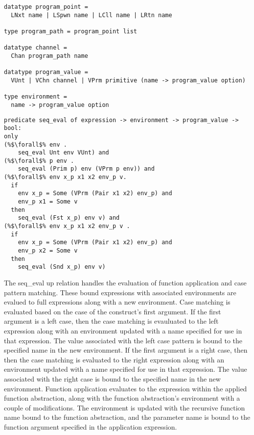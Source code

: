 \documentclass{article}
\begin{document}
\begin{lstlisting}[language=logic, style=codestyle1, escapechar=\%]
datatype program_point =
  LNxt name | LSpwn name | LCll name | LRtn name 

type program_path = program_point list

datatype channel =
  Chan program_path name 

datatype program_value = 
  VUnt | VChn channel | VPrm primitive (name -> program_value option)

type environment =
  name -> program_value option

\end{lstlisting}


\begin{lstlisting}[language=logic, style=codestyle1, escapechar=\%]
predicate seq_eval of expression -> environment -> program_value -> bool:
only
(%$\forall$% env . 
    seq_eval Unt env VUnt) and
(%$\forall$% p env .
    seq_eval (Prim p) env (VPrm p env)) and
(%$\forall$% env x_p x1 x2 env_p v. 
  if
    env x_p = Some (VPrm (Pair x1 x2) env_p) and
    env_p x1 = Some v
  then
    seq_eval (Fst x_p) env v) and
(%$\forall$% env x_p x1 x2 env_p v . 
  if
    env x_p = Some (VPrm (Pair x1 x2) env_p) and 
    env_p x2 = Some v 
  then
    seq_eval (Snd x_p) env v)

\end{lstlisting}


The seq\_eval up relation handles the evaluation of function application and case pattern
matching. These bound expressions with associated environments are evalued to full expressions
along with a new environment.  Case matching is evaluated based on the case of the construct's
first argument. If the first argument is a left case, then the case matching is evauluated to
the left expression along with an environment updated with a name specified for use in that
expression. The value associated with the left case pattern is bound to the specified name in
the new environment. If the first argument is a right case, then then the case matching is
evaluated to the right expression along with an environment updated with a name specified for
use in that expression. The value associated with the right case is bound to the specified
name in the new environment. Function application evaluates to the expression within the
applied function abstraction, along with the function abstraction's environment with a couple
of modifications. The environment is updated with the recursive function name bound to the
function abstraction, and the parameter name is bound to the function argument specified in the
application expression. 
\end{document}
